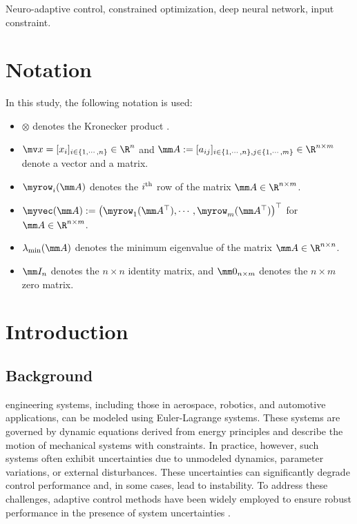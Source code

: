\documentclass[lettersize,journal]{IEEEtran}
\begin{document}
\begin{IEEEkeywords}
    Neuro-adaptive control, constrained optimization, deep neural network, input constraint.
\end{IEEEkeywords}

\section*{Notation}
In this study, the following notation is used:

\begin{itemize}
    \item $\otimes$ denotes the Kronecker product \cite[Definition 7.1.2]{Bernstein:2009aa}.
    \item $\mv x=[x_i]_{i\in\{1,\cdots,n\}}\in\R^n$ and $
        \mm A
        := 
        [a_{ij}]
        _{
            i\in\{1,\cdots,n\},j\in\{1,\cdots ,m\}
        }\allowbreak\in\R^{n\times m}
        $ denote a vector and a matrix.
    \item $\myrow_i(\mm A)$ denotes the $i\textsuperscript{th}$ row of the matrix $\mm A\in\R^{n\times m}$. 
    \item $\myvec(\mm A):= \left(\myrow_1(\mm A^\top)  ,\cdots,\myrow_m(\mm A^\top)  \right)^\top   $ for $\mm A\in\R^{n\times m}$.
    \item $\lambda_{\min}(\mm A)$ denotes the minimum eigenvalue of the matrix $\mm A\in\R^{n\times n}$.
    \item $\mm I_n$ denotes the $n\times n$ identity matrix, and $\mm 0_{n\times m}$ denotes the $n\times m$ zero matrix.
\end{itemize}

\section{Introduction}

\subsection{Background}

 engineering systems, including those in aerospace, robotics, and automotive applications, can be modeled using Euler-Lagrange systems. 
These systems are governed by dynamic equations derived from energy principles and describe the motion of mechanical systems with constraints. 
In practice, however, such systems often exhibit uncertainties due to unmodeled dynamics, parameter variations, or external disturbances. 
These uncertainties can significantly degrade control performance and, in some cases, lead to instability. 
To address these challenges, adaptive control methods have been widely employed to ensure robust performance in the presence of system uncertainties \cite{Ioannou:2006aa, Tao:2003aa}.
\end{document}

